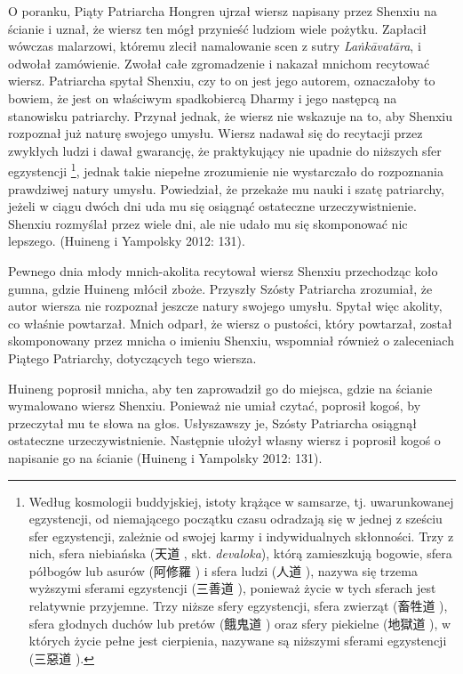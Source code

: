 O poranku, Piąty Patriarcha Hongren ujrzał wiersz napisany przez Shenxiu na ścianie i uznał, że wiersz ten mógł przynieść ludziom wiele pożytku. Zapłacił wówczas malarzowi, któremu zlecił namalowanie scen z sutry \textit{La\.nkāvatāra}, i odwołał zamówienie.
Zwołał całe zgromadzenie i nakazał mnichom recytować wiersz. Patriarcha spytał Shenxiu, czy to on jest jego autorem, oznaczałoby to bowiem, że jest on właściwym spadkobiercą Dharmy i jego następcą na stanowisku patriarchy.
Przynał jednak, że wiersz nie wskazuje na to, aby Shenxiu rozpoznał już naturę swojego umysłu. Wiersz nadawał się do recytacji przez zwykłych ludzi i dawał gwarancję, że praktykujący nie upadnie do niższych sfer egzystencji%
\footnote{Według kosmologii buddyjskiej, istoty krążące w samsarze, tj. uwarunkowanej egzystencji, od niemającego początku czasu odradzają się w jednej z sześciu sfer egzystencji, zależnie od swojej karmy i indywidualnych skłonności. Trzy z nich, sfera niebiańska (天道 , skt. \textit{devaloka}), którą zamieszkują bogowie, sfera półbogów lub asurów (阿修羅 ) i sfera ludzi (人道 ), nazywa się trzema wyższymi sferami egzystencji (三善道 ), ponieważ życie w tych sferach jest relatywnie przyjemne. Trzy niższe sfery egzystencji, sfera zwierząt (畜牲道 ), sfera głodnych duchów lub pretów (餓鬼道 ) oraz sfery piekielne (地獄道 ), w których życie pełne jest cierpienia, nazywane są niższymi sferami egzystencji (三惡道 ).},
jednak takie niepełne zrozumienie nie wystarczało do rozpoznania prawdziwej natury umysłu.
Powiedział, że przekaże mu nauki i szatę patriarchy, jeżeli w ciągu dwóch dni uda mu się osiągnąć ostateczne urzeczywistnienie.
Shenxiu rozmyślał przez wiele dni, ale nie udało mu się skomponować nic lepszego.
(Huineng i Yampolsky 2012: 131).

Pewnego dnia młody mnich-akolita recytował wiersz Shenxiu przechodząc koło gumna, gdzie Huineng młócił zboże. Przyszły Szósty Patriarcha zrozumiał, że autor wiersza nie rozpoznał jeszcze natury swojego umysłu. Spytał więc akolity, co właśnie powtarzał. Mnich odparł, że wiersz o pustości, który powtarzał, został skomponowany przez mnicha o imieniu Shenxiu, wspomniał również o zaleceniach Piątego Patriarchy, dotyczących tego wiersza.

Huineng poprosił mnicha, aby ten zaprowadził go do miejsca, gdzie na ścianie wymalowano wiersz Shenxiu. Ponieważ nie umiał czytać, poprosił kogoś, by przeczytał mu te słowa na głos. Usłyszawszy je, Szósty Patriarcha osiągnął ostateczne urzeczywistnienie. Następnie ułożył własny wiersz i poprosił kogoś o napisanie go na ścianie (Huineng i Yampolsky 2012: 131).

